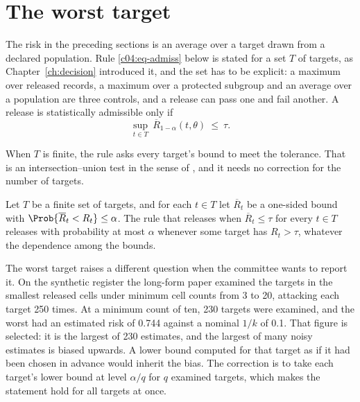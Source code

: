 \section{The worst target}

The risk in the preceding sections is an average over a target drawn from a declared
population. Rule \eqref{c04:eq-admiss} below is stated for a set $T$ of targets, as
Chapter~\ref{ch:decision} introduced it, and the set has to be explicit: a maximum over released
records, a maximum over a protected subgroup and an average over a population are three
controls, and a release can pass one and fail another. A release is statistically
admissible only if
\begin{equation}\label{c04:eq-admiss}
\sup_{t \in T}\ \overline{R}_{1-\alpha}(t,\theta) \ \le\ \tau .
\end{equation}

When $T$ is finite, the rule asks every target's bound to meet the tolerance. That is an
intersection--union test in the sense of \citet{berger1982}, and it needs no correction
for the number of targets.

\begin{proposition}\label{c04:prop-iut}
Let $T$ be a finite set of targets, and for each $t \in T$ let $\overline{R}_t$ be a
one-sided bound with $\Prob\{\overline{R}_t < R_t\} \le \alpha$. The rule that releases
when $\overline{R}_t \le \tau$ for every $t \in T$ releases with probability at most
$\alpha$ whenever some target has $R_t > \tau$, whatever the dependence among the bounds.
\end{proposition}

The worst target raises a different question when the committee wants to report it. On
the synthetic register the long-form paper examined the targets in the smallest released
cells under minimum cell counts from 3 to 20, attacking each target 250 times. At a
minimum count of ten, 230 targets were examined, and the worst had an estimated risk of
0.744 against a nominal $1/k$ of 0.1.
That figure is selected: it is the largest of 230 estimates, and the largest of many
noisy estimates is biased upwards. A lower bound computed for that target as if it had
been chosen in advance would inherit the bias. The correction is to take each target's
lower bound at level $\alpha/q$ for $q$ examined targets, which makes the statement hold
for all targets at once.


